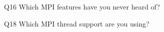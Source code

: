 \begin{description}%
\item{Q16} Which MPI features have you never heard of?%
\item{Q18} Which MPI thread support are you using?%
\end{description}%
